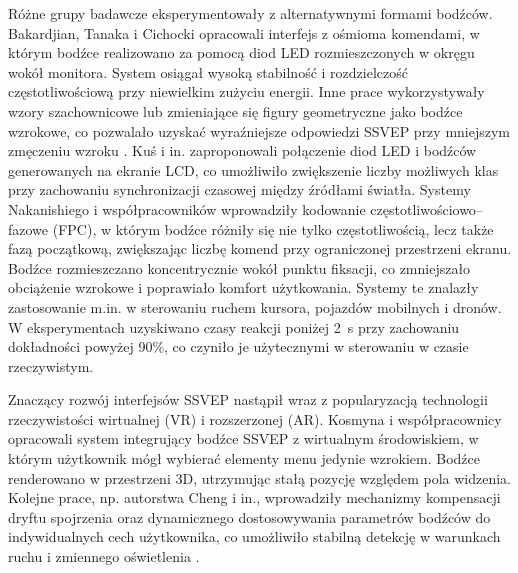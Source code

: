 Różne grupy badawcze eksperymentowały z alternatywnymi formami bodźców. Bakardjian, Tanaka i Cichocki \cite{bakardjian2010optimization} opracowali interfejs z ośmioma komendami, w którym bodźce realizowano za pomocą diod LED rozmieszczonych w okręgu wokół monitora. System osiągał wysoką stabilność i rozdzielczość częstotliwościową przy niewielkim zużyciu energii. Inne prace wykorzystywały wzory szachownicowe lub zmieniające się figury geometryczne jako bodźce wzrokowe, co pozwalało uzyskać wyraźniejsze odpowiedzi SSVEP przy mniejszym zmęczeniu wzroku \cite{chen2015}. Kuś i in. \cite{kus2013quantification} zaproponowali połączenie diod LED i bodźców generowanych na ekranie LCD, co umożliwiło zwiększenie liczby możliwych klas przy zachowaniu synchronizacji czasowej między źródłami światła. Systemy Nakanishiego i współpracowników \cite{nakanishi2015} wprowadziły kodowanie częstotliwościowo--fazowe (FPC), w którym bodźce różniły się nie tylko częstotliwością, lecz także fazą początkową, zwiększając liczbę komend przy ograniczonej przestrzeni ekranu. Bodźce rozmieszczano koncentrycznie wokół punktu fiksacji, co zmniejszało obciążenie wzrokowe i poprawiało komfort użytkowania. Systemy te znalazły zastosowanie m.in. w sterowaniu ruchem kursora, pojazdów mobilnych i dronów. W eksperymentach uzyskiwano czasy reakcji poniżej 2~s przy zachowaniu dokładności powyżej 90\%, co czyniło je użytecznymi w sterowaniu w czasie rzeczywistym.

Znaczący rozwój interfejsów SSVEP nastąpił wraz z popularyzacją technologii rzeczywistości wirtualnej (VR) i rozszerzonej (AR). Kosmyna i współpracownicy \cite{kosmyna2018} opracowali system integrujący bodźce SSVEP z wirtualnym środowiskiem, w którym użytkownik mógł wybierać elementy menu jedynie wzrokiem. Bodźce renderowano w przestrzeni 3D, utrzymując stałą pozycję względem pola widzenia. Kolejne prace, np. autorstwa Cheng i in., wprowadziły mechanizmy kompensacji dryftu spojrzenia oraz dynamicznego dostosowywania parametrów bodźców do indywidualnych cech użytkownika, co umożliwiło stabilną detekcję w warunkach ruchu i zmiennego oświetlenia \cite{cheng2020}.